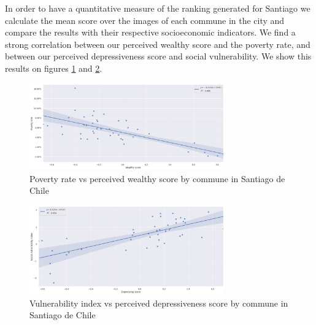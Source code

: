 In order to have a quantitative measure of the ranking generated for Santiago we calculate the mean score over
the images of each commune in the city and compare the results with their respective
socioeconomic indicators. We find a strong correlation between our perceived wealthy score
and the poverty rate, and between our perceived depressiveness score and social vulnerability.
We show this results on figures \ref{fig:poverty} and \ref{fig:vulnerability}.

\begin{figure}[ht]
	\begin{center}
	\includegraphics[width=0.75\textwidth]{./figures/poverty_rate.png}
	\caption[Poverty rate vs perceived wealthy score]{
        Poverty rate vs perceived wealthy score by commune in Santiago de Chile
    }
	\label{fig:poverty}
	\end{center}
\end{figure}

\begin{figure}[ht]
	\begin{center}
	\includegraphics[width=0.75\textwidth]{./figures/vulnerability_index.png}
	\caption[Vulnerability index vs perceived depressiveness score]{
        Vulnerability index vs perceived depressiveness score by commune in Santiago de Chile
    }
	\label{fig:vulnerability}
	\end{center}
\end{figure}